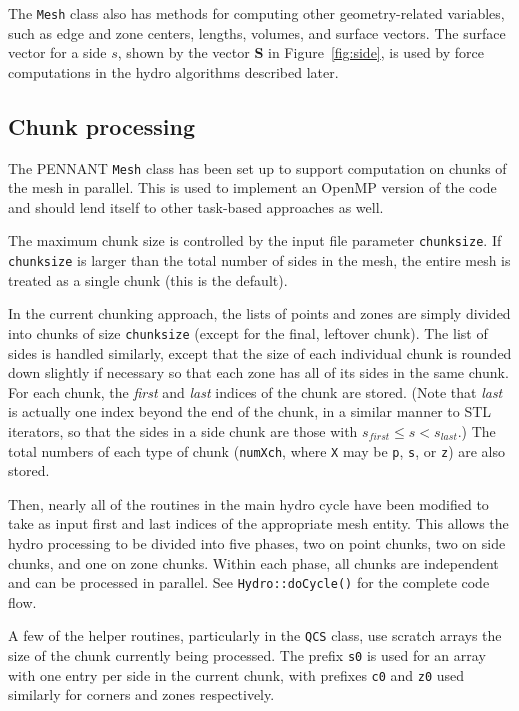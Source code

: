 \documentclass[11pt,letterpaper]{article} %
\begin{document}
The {\tt Mesh} class also has methods for computing other
geometry-related variables, such as edge and zone centers, lengths,
volumes, and surface vectors.  The surface vector for a side $s$, shown
by the vector {\bf S} in Figure~\ref{fig:side}, is used by force
computations in the hydro algorithms described later.

\subsection{Chunk processing}

The PENNANT {\tt Mesh} class has been set up to support computation
on chunks of the mesh in parallel.  This is used to implement an OpenMP
version of the code and should lend itself to other task-based approaches
as well.

The maximum chunk size is controlled by the input file parameter
{\tt chunksize}.  If {\tt chunksize} is larger than the total number of
sides in the mesh, the entire mesh is treated as a single chunk
(this is the default).

In the current chunking approach, the lists of points and zones are
simply divided into chunks of size {\tt chunksize} (except for the final,
leftover chunk).  The list of sides is handled similarly, except that
the size of each individual chunk is rounded down slightly if necessary
so that each zone has all of its sides in the same chunk.  For each chunk,
the {\em first} and {\em last} indices of the chunk are stored.
(Note that {\em last} is actually one index beyond the end of the chunk,
in a similar manner to STL iterators, so that the sides in a side chunk
are those with $s_{first} \le s < s_{last}$.)  The total numbers of each
type of chunk ({\tt numXch}, where {\tt X} may be {\tt p}, {\tt s}, or
{\tt z}) are also stored.

Then, nearly all of the routines in the main hydro cycle have been
modified to take as input first and last indices of the appropriate
mesh entity.  This allows the hydro processing to be divided into
five phases, two on point chunks, two on side chunks, and one on zone
chunks.  Within each phase, all chunks are independent and can be
processed in parallel.
See {\tt Hydro::doCycle()} for the complete code flow.

A few of the helper routines, particularly in the {\tt QCS} class,
use scratch arrays the size of the chunk currently being processed.
The prefix {\tt s0} is used for an array with one entry per side
in the current chunk, with prefixes {\tt c0} and {\tt z0} used similarly
for corners and zones respectively.
\end{document}
